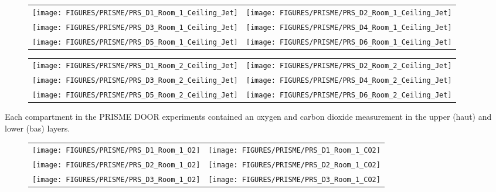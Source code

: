 \begin{figure}[!ht]
\begin{tabular*}{\textwidth}{l@{\extracolsep{\fill}}r}
\texttt{[image: FIGURES/PRISME/PRS\_D1\_Room\_1\_Ceiling\_Jet]} &
\texttt{[image: FIGURES/PRISME/PRS\_D2\_Room\_1\_Ceiling\_Jet]} \\
\texttt{[image: FIGURES/PRISME/PRS\_D3\_Room\_1\_Ceiling\_Jet]} &
\texttt{[image: FIGURES/PRISME/PRS\_D4\_Room\_1\_Ceiling\_Jet]} \\
\texttt{[image: FIGURES/PRISME/PRS\_D5\_Room\_1\_Ceiling\_Jet]} &
\texttt{[image: FIGURES/PRISME/PRS\_D6\_Room\_1\_Ceiling\_Jet]}
\end{tabular*}
\label{PRISME_Ceiling_Jet_Room_1}
\end{figure}

\begin{figure}[p]
\begin{tabular*}{\textwidth}{l@{\extracolsep{\fill}}r}
\texttt{[image: FIGURES/PRISME/PRS\_D1\_Room\_2\_Ceiling\_Jet]} &
\texttt{[image: FIGURES/PRISME/PRS\_D2\_Room\_2\_Ceiling\_Jet]} \\
\texttt{[image: FIGURES/PRISME/PRS\_D3\_Room\_2\_Ceiling\_Jet]} &
\texttt{[image: FIGURES/PRISME/PRS\_D4\_Room\_2\_Ceiling\_Jet]} \\
\texttt{[image: FIGURES/PRISME/PRS\_D5\_Room\_2\_Ceiling\_Jet]} &
\texttt{[image: FIGURES/PRISME/PRS\_D6\_Room\_2\_Ceiling\_Jet]}
\end{tabular*}
\label{PRISME_Ceiling_Jet_Room_2}
\end{figure}

\clearpage

Each compartment in the PRISME DOOR experiments contained an oxygen and carbon dioxide measurement in the upper (haut) and lower (bas) layers.

\begin{figure}[!ht]
\begin{tabular*}{\textwidth}{l@{\extracolsep{\fill}}r}
\texttt{[image: FIGURES/PRISME/PRS\_D1\_Room\_1\_O2]} &
\texttt{[image: FIGURES/PRISME/PRS\_D1\_Room\_1\_CO2]} \\
\texttt{[image: FIGURES/PRISME/PRS\_D2\_Room\_1\_O2]} &
\texttt{[image: FIGURES/PRISME/PRS\_D2\_Room\_1\_CO2]} \\
\texttt{[image: FIGURES/PRISME/PRS\_D3\_Room\_1\_O2]} &
\texttt{[image: FIGURES/PRISME/PRS\_D3\_Room\_1\_CO2]}
\end{tabular*}
\label{PRISME_Gas_1}
\end{figure}

